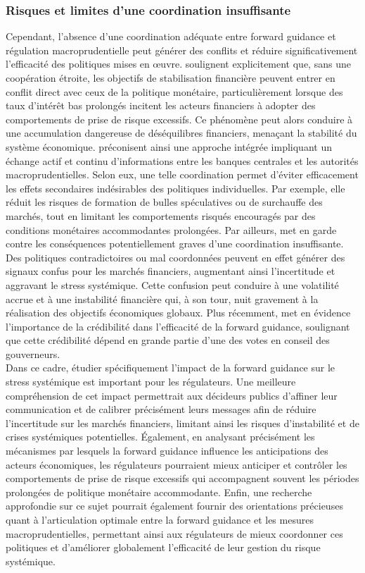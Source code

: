 \subsubsection{Risques et limites d’une coordination insuffisante}

Cependant, l’absence d’une coordination adéquate entre forward guidance et régulation macroprudentielle peut générer des conflits et réduire significativement l’efficacité des politiques mises en œuvre. \citep{farhi2016} soulignent explicitement que, sans une coopération étroite, les objectifs de stabilisation financière peuvent entrer en conflit direct avec ceux de la politique monétaire, particulièrement lorsque des taux d'intérêt bas prolongés incitent les acteurs financiers à adopter des comportements de prise de risque excessifs. Ce phénomène peut alors conduire à une accumulation dangereuse de déséquilibres financiers, menaçant la stabilité du système économique. \citep{claessens2013} préconisent ainsi une approche intégrée impliquant un échange actif et continu d'informations entre les banques centrales et les autorités macroprudentielles. Selon eux, une telle coordination permet d’éviter efficacement les effets secondaires indésirables des politiques individuelles. Par exemple, elle réduit les risques de formation de bulles spéculatives ou de surchauffe des marchés, tout en limitant les comportements risqués encouragés par des conditions monétaires accommodantes prolongées. Par ailleurs, \citep{rey2015} met en garde contre les conséquences potentiellement graves d’une coordination insuffisante. Des politiques contradictoires ou mal coordonnées peuvent en effet générer des signaux confus pour les marchés financiers, augmentant ainsi l’incertitude et aggravant le stress systémique. Cette confusion peut conduire à une volatilité accrue et à une instabilité financière qui, à son tour, nuit gravement à la réalisation des objectifs économiques globaux. Plus récemment, \citep{linta2024} met en évidence l'importance de la crédibilité dans l'efficacité de la forward guidance, soulignant que cette crédibilité dépend en grande partie d'une des votes en conseil des gouverneurs.\\

Dans ce cadre, étudier spécifiquement l'impact de la forward guidance sur le stress systémique est important pour les régulateurs. Une meilleure compréhension de cet impact permettrait aux décideurs publics d'affiner leur communication et de calibrer précisément leurs messages afin de réduire l’incertitude sur les marchés financiers, limitant ainsi les risques d’instabilité et de crises systémiques potentielles. Également, en analysant précisément les mécanismes par lesquels la forward guidance influence les anticipations des acteurs économiques, les régulateurs pourraient mieux anticiper et contrôler les comportements de prise de risque excessifs qui accompagnent souvent les périodes prolongées de politique monétaire accommodante. Enfin, une recherche approfondie sur ce sujet pourrait également fournir des orientations précieuses quant à l’articulation optimale entre la forward guidance et les mesures macroprudentielles, permettant ainsi aux régulateurs de mieux coordonner ces politiques et d’améliorer globalement l’efficacité de leur gestion du risque systémique.

